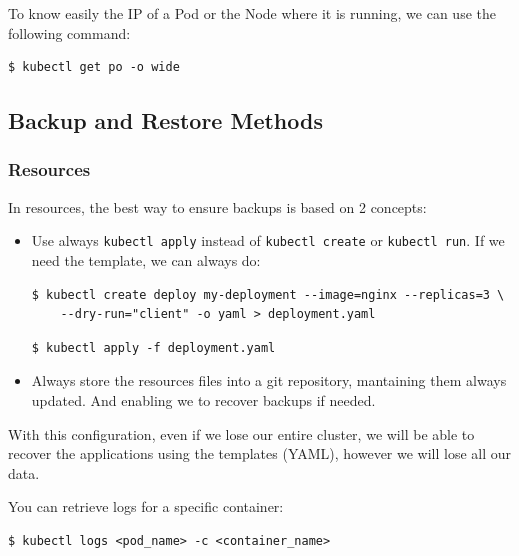 \documentclass{article}
\newenvironment{blocktemplateI}[1]{%
    \tcolorbox[beamer,%
    noparskip,breakable,
    colframe=Violet,%
    colbacklower=Black,%
    title=#1]}%
    {\endtcolorbox}
\newenvironment{codetemplate}[1][]{%
  \mybasecolorbox[#1]
  \itshape
}{%
  \endmybasecolorbox
}
\begin{document}
\begin{blocktemplateI}{NOTE}
To know easily the IP of a Pod or the Node where it is running, we can use the following command:
\begin{codetemplate}{}
\begin{verbatim}
$ kubectl get po -o wide
\end{verbatim}
\end{codetemplate}
\end{blocktemplateI}

\subsection{Backup and Restore Methods}
\subsubsection{Resources}
In resources, the best way to ensure backups is based on 2 concepts:
\begin{itemize}
    \item Use always \verb|kubectl apply| instead of \verb|kubectl create| or \verb|kubectl run|. If we need the template, we can always do:
\begin{codetemplate}{}
\begin{verbatim}
$ kubectl create deploy my-deployment --image=nginx --replicas=3 \
    --dry-run="client" -o yaml > deployment.yaml
\end{verbatim}
\end{codetemplate}
\begin{codetemplate}{}
\begin{verbatim}
$ kubectl apply -f deployment.yaml
\end{verbatim}
\end{codetemplate}

    \item Always store the resources files into a git repository, mantaining them always updated. And enabling we to recover backups if needed.
\end{itemize}

With this configuration, even if we lose our entire cluster, we will be able to recover the applications using the templates (YAML), however we will lose all our data.

You can retrieve logs for a specific container:
\begin{codetemplate}{}
\begin{verbatim}
$ kubectl logs <pod_name> -c <container_name>
\end{verbatim}
\end{codetemplate}
\end{document}
